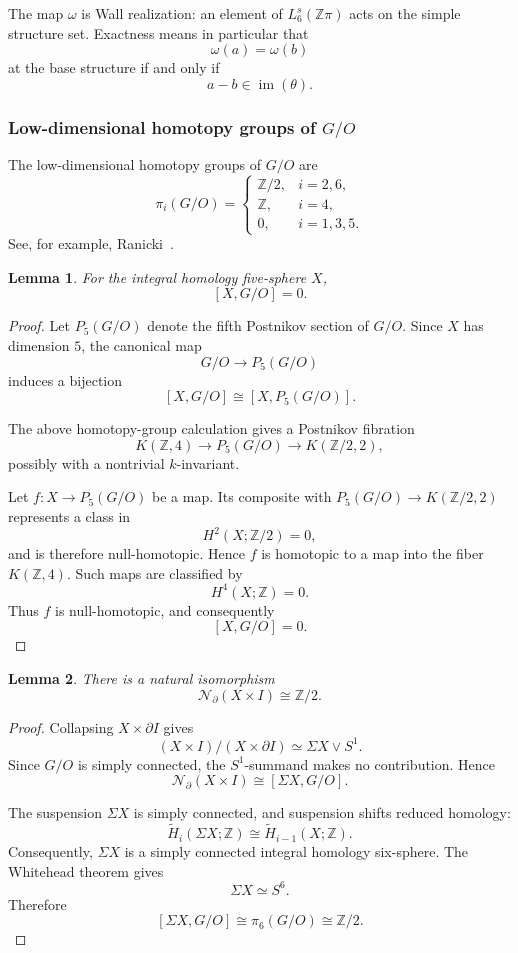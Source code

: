 \documentclass[10pt,reqno]{amsart}
\numberwithin{equation}{section}
\newtheorem{lemma}{Lemma}
\theoremstyle{definition}
\theoremstyle{remark}
\newcommand{\Z}{\mathbb Z}
\newcommand{\cN}{\mathcal N}
\newcommand{\im}{\operatorname{im}}
\newcommand{\Susp}{\Sigma}
\begin{document}
The map \(\omega\) is Wall realization: an element of
\(L_6^s(\Z\pi)\) acts on the simple structure set.  Exactness means in
particular that
\[
\omega(a)=\omega(b)
\]
at the base structure if and only if
\[
a-b\in\im(\theta).
\]

\subsubsection{Low-dimensional homotopy groups of \texorpdfstring{\(G/O\)}{G/O}}

The low-dimensional homotopy groups of \(G/O\) are
\[
\pi_i(G/O)=
\begin{cases}
\mathbb Z/2,& i=2,6,\\
\mathbb Z,& i=4,\\
0,& i=1,3,5.
\end{cases}
\]
See, for example, Ranicki~\cite[Remark~9.22]{RanickiAG}.

\begin{lemma}\label{lem:normal-invariants-zero}
For the integral homology five-sphere \(X\),
\[
[X,G/O]=0.
\]
\end{lemma}

\begin{proof}
Let \(P_5(G/O)\) denote the fifth Postnikov section of \(G/O\).
Since \(X\) has dimension \(5\), the canonical map
\[
G/O\longrightarrow P_5(G/O)
\]
induces a bijection
\[
[X,G/O]\cong [X,P_5(G/O)].
\]

The above homotopy-group calculation gives a Postnikov fibration
\[
K(\mathbb Z,4)
\longrightarrow P_5(G/O)
\longrightarrow K(\mathbb Z/2,2),
\]
possibly with a nontrivial \(k\)-invariant.

Let \(f\colon X\to P_5(G/O)\) be a map.  Its composite with
\(P_5(G/O)\to K(\mathbb Z/2,2)\) represents a class in
\[
H^2(X;\mathbb Z/2)=0,
\]
and is therefore null-homotopic.  Hence \(f\) is homotopic to a map
into the fiber \(K(\mathbb Z,4)\).  Such maps are classified by
\[
H^4(X;\mathbb Z)=0.
\]
Thus \(f\) is null-homotopic, and consequently
\[
[X,G/O]=0.
\]
\end{proof}

\begin{lemma}\label{lem:relative-normal}
There is a natural isomorphism
\[
\cN_{\partial}(X\times I)\cong\Z/2.
\]
\end{lemma}

\begin{proof}
Collapsing \(X\times\partial I\) gives
\[
(X\times I)/(X\times\partial I)
\simeq
\Susp X\vee S^1.
\]
Since \(G/O\) is simply connected, the \(S^1\)-summand makes no
contribution.  Hence
\[
\cN_{\partial}(X\times I)
\cong[\Susp X,G/O].
\]

The suspension \(\Susp X\) is simply connected, and suspension shifts
reduced homology:
\[
\widetilde H_i(\Susp X;\Z)
\cong
\widetilde H_{i-1}(X;\Z).
\]
Consequently, \(\Susp X\) is a simply connected integral homology
six-sphere. The Whitehead theorem gives
\[
\Susp X\simeq S^6.
\]
Therefore
\[
[\Susp X,G/O]
\cong
\pi_6(G/O)
\cong
\Z/2.
\]
\end{proof}
\end{document}
